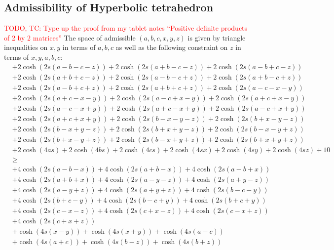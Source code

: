 \documentclass[notitlepage, 10pt]{article}
\begin{document}
\subsection{Admissibility of Hyperbolic tetrahedron}

\textcolor{red}{TODO, TC: Type up the proof from my tablet notes ``Positive definite products of 2 by 2 matrices''}
The space of admissible $(a,b,c,x,y,z)$ is given by triangle inequalities on $x,y$ in terms of $a,b,c$ as well as the following constraint on $z$ in terms of $x,y,a,b,c$:
\begin{equation}
    \begin{split}
        &+2 \cosh (2 s (a-b-c-z))+2 \cosh (2 s (a+b-c-z))+2 \cosh (2 s (a-b+c-z))\\
        &+2 \cosh (2 s (a+b+c-z))+2 \cosh (2 s (a-b-c+z))+2 \cosh (2 s (a+b-c+z))\\
        &+2 \cosh (2 s (a-b+c+z))+2 \cosh (2 s (a+b+c+z))+2 \cosh (2 s (a-c-x-y))\\
        &+2 \cosh (2 s (a+c-x-y))+2 \cosh (2 s (a-c+x-y))+2 \cosh (2 s (a+c+x-y))\\
        &+2 \cosh (2 s (a-c-x+y))+2 \cosh (2 s (a+c-x+y))+2 \cosh (2 s (a-c+x+y))\\
        &+2 \cosh (2 s (a+c+x+y))+2 \cosh (2 s (b-x-y-z))+2 \cosh (2 s (b+x-y-z))\\
        &+2 \cosh (2 s (b-x+y-z))+2 \cosh (2 s (b+x+y-z))+2 \cosh (2 s (b-x-y+z))\\
        &+2 \cosh (2 s (b+x-y+z))+2 \cosh (2 s (b-x+y+z))+2 \cosh (2 s (b+x+y+z))\\
        &+2 \cosh (4 a s)+2 \cosh (4 b s)+2 \cosh (4 c s)+2 \cosh (4 s x)+2 \cosh (4 s y)+2 \cosh (4 s z)+10\\
        &\geq\\
        &+4 \cosh (2 s (a-b-x))+4 \cosh (2 s (a+b-x))+4 \cosh (2 s (a-b+x))\\
        &+4 \cosh (2 s (a+b+x))+4 \cosh (2 s (a-y-z))+4 \cosh (2 s (a+y-z))\\
        &+4 \cosh (2 s (a-y+z))+4 \cosh (2 s (a+y+z))+4 \cosh (2 s (b-c-y))\\
        &+4 \cosh (2 s (b+c-y))+4 \cosh (2 s (b-c+y))+4 \cosh (2 s (b+c+y))\\
        &+4 \cosh (2 s (c-x-z))+4 \cosh (2 s (c+x-z))+4 \cosh (2 s (c-x+z))\\
        &+4 \cosh (2 s (c+x+z))\\
        &+\cosh (4 s (x-y))+\cosh (4 s (x+y))+\cosh (4 s (a-c))\\
        &+\cosh (4 s (a+c))+\cosh (4 s (b-z))+\cosh (4 s (b+z))
    \end{split}
\end{equation}
\end{document}
